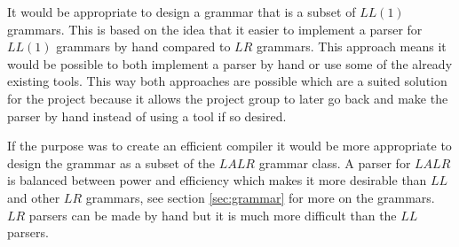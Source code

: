 It would be appropriate to design a grammar that is a subset of $LL(1)$ grammars. This is based on the idea that it easier to implement a parser for $LL(1)$ grammars by hand compared to $LR$ grammars. This approach means it would be possible to both implement a parser by hand or use some of the already existing tools. This way both approaches are possible which are a suited solution for the project because it allows the project group to later go back and make the parser by hand instead of using a tool if so desired.

If the purpose was to create an efficient compiler it would be more appropriate to design the grammar as a subset of the $LALR$ grammar class. A parser for $LALR$ is balanced between power and efficiency which makes it more desirable than $LL$ and other $LR$ grammars, see section \ref{sec:grammar} for more on the grammars. $LR$ parsers can be made by hand but it is much more difficult than the $LL$ parsers.